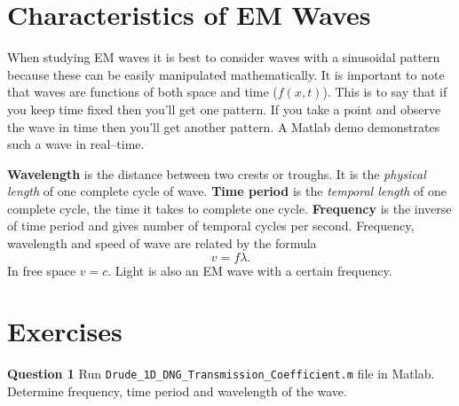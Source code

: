 \documentclass[12pt,a4paper]{article}
\begin{document}
\section{Characteristics of EM Waves}
When studying EM waves it is best to consider waves with a sinusoidal pattern because these can be easily manipulated mathematically. It is important to note that waves are functions of both space and time ($f(x,t)$). This is to say that if you keep time fixed then you'll get one pattern. If you take a point and observe the wave in time then you'll get another pattern. A Matlab demo demonstrates such a wave in real--time.

\textbf{Wavelength} is the distance between two crests or troughs. It is the \textit{physical length} of one complete cycle of wave. \textbf{Time period} is the \textit{temporal length} of one complete cycle, the time it takes to complete one cycle. \textbf{Frequency} is the inverse of time period and gives number of temporal cycles per second. Frequency, wavelength and speed of wave are related by the formula
\begin{equation}
v=f\lambda.
\end{equation}
In free space $v=c$. Light is also an EM wave with a certain frequency.

\section{Exercises}
\noindent\textbf{Question 1} Run \verb|Drude_1D_DNG_Transmission_Coefficient.m| file in Matlab. Determine frequency, time period and wavelength of the wave.\\


\end{document}
